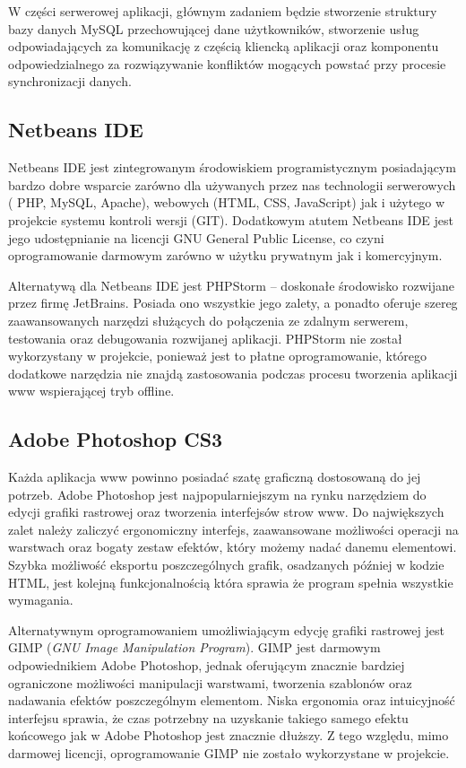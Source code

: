 W części serwerowej aplikacji, głównym zadaniem będzie stworzenie struktury bazy danych \mbox{MySQL} przechowującej dane użytkowników, stworzenie usług odpowiadających za komunikację z częścią kliencką aplikacji oraz komponentu odpowiedzialnego za rozwiązywanie konfliktów mogących powstać przy procesie synchronizacji danych.

\subsection{Netbeans IDE}
\label{sec:netbeans}

Netbeans IDE jest zintegrowanym środowiskiem programistycznym posiadającym bardzo dobre wsparcie zarówno dla używanych przez nas technologii serwerowych ( PHP, MySQL, Apache), webowych (HTML, CSS, JavaScript) jak i użytego w projekcie systemu kontroli wersji (GIT). Dodatkowym atutem Netbeans IDE jest jego udostępnianie na licencji GNU General Public License, co czyni oprogramowanie darmowym zarówno w użytku prywatnym jak i komercyjnym.

Alternatywą dla Netbeans IDE jest PHPStorm -- doskonałe środowisko rozwijane przez firmę JetBrains. Posiada ono wszystkie jego zalety, a ponadto oferuje szereg zaawansowanych narzędzi służących do połączenia ze zdalnym serwerem, testowania oraz debugowania rozwijanej aplikacji. PHPStorm nie został wykorzystany w projekcie, ponieważ jest to płatne oprogramowanie, którego dodatkowe narzędzia nie znajdą zastosowania podczas procesu tworzenia aplikacji www wspierającej tryb offline.

\subsection{Adobe Photoshop CS3}
\label{sec:photoshop}

Każda aplikacja www powinno posiadać szatę graficzną dostosowaną do jej potrzeb. Adobe Photoshop jest najpopularniejszym na rynku narzędziem do edycji grafiki rastrowej oraz tworzenia interfejsów strow www. Do największych zalet należy zaliczyć ergonomiczny interfejs, zaawansowane możliwości operacji na warstwach oraz bogaty zestaw efektów, który możemy nadać danemu elementowi. Szybka możliwość eksportu poszczególnych grafik, osadzanych później w kodzie HTML, jest kolejną funkcjonalnością która sprawia że program spełnia wszystkie wymagania.

Alternatywnym oprogramowaniem umożliwiającym edycję grafiki rastrowej jest GIMP (\emph{GNU Image Manipulation Program}). GIMP jest darmowym odpowiednikiem Adobe Photoshop, jednak oferującym znacznie bardziej ograniczone możliwości manipulacji warstwami, tworzenia szablonów oraz nadawania efektów poszczególnym elementom. Niska ergonomia oraz intuicyjność interfejsu sprawia, że czas potrzebny na uzyskanie takiego samego efektu końcowego jak w Adobe Photoshop jest znacznie dłuższy. Z tego względu, mimo darmowej licencji, oprogramowanie GIMP nie zostało wykorzystane w projekcie.


